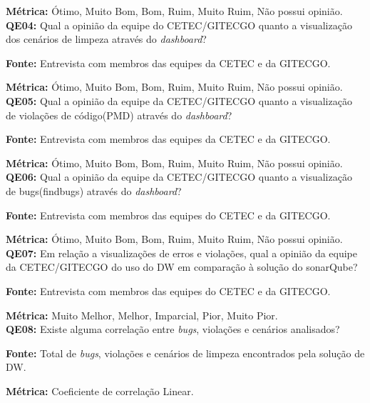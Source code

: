 \textbf{Métrica:} Ótimo, Muito Bom, Bom, Ruim, Muito Ruim, Não possui opinião.\\



\textbf{QE04: } Qual a opinião da equipe do CETEC/GITECGO quanto a visualização dos cenários  de limpeza através do \textit{dashboard}?

\textbf{Fonte:} Entrevista com membros das equipes da CETEC e da GITECGO.

\textbf{Métrica:} Ótimo, Muito Bom, Bom, Ruim, Muito Ruim, Não possui opinião.\\



\textbf{QE05: } Qual a opinião da equipe da CETEC/GITECGO quanto a visualização de violações de código(PMD) através do \textit{dashboard}?

\textbf{Fonte:} Entrevista com membros das equipes da CETEC e da GITECGO.

\textbf{Métrica:} Ótimo, Muito Bom, Bom, Ruim, Muito Ruim, Não possui opinião.\\



\textbf{QE06: } Qual a opinião da equipe da CETEC/GITECGO quanto a visualização de bugs(findbugs) através do \textit{dashboard}?

\textbf{Fonte:} Entrevista com membros das equipes do CETEC e da GITECGO.

\textbf{Métrica:} Ótimo, Muito Bom, Bom, Ruim, Muito Ruim, Não possui opinião.\\




\textbf{QE07: } Em relação a visualizações de erros e violações, qual a opinião da equipe da CETEC/GITECGO do uso do DW em comparação à solução do sonarQube?

\textbf{Fonte:} Entrevista com membros das equipes do CETEC e da GITECGO.

\textbf{Métrica:} Muito Melhor, Melhor, Imparcial, Pior, Muito Pior.\\



\textbf{QE08: } Existe alguma correlação entre \textit{bugs}, violações e cenários analisados? 

\textbf{Fonte:} Total de \textit{bugs}, violações e cenários de limpeza encontrados pela solução de DW.

\textbf{Métrica:} Coeficiente de correlação Linear.\\


